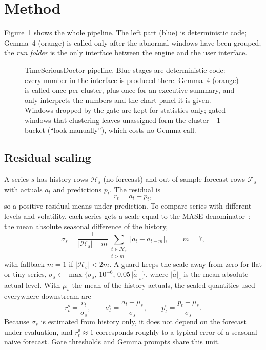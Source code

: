 \documentclass[10pt,twocolumn,a4paper]{article}
\newcommand{\rS}{r^{\mathrm{s}}}
\newcommand{\aS}{a^{\mathrm{s}}}
\newcommand{\pS}{p^{\mathrm{s}}}
\begin{document}
\section{Method}
\label{sec:method}

Figure~\ref{fig:arch} shows the whole pipeline. The left part (blue) is deterministic code; Gemma~4 (orange) is called only after the abnormal windows have been grouped; the \emph{run folder} is the only interface between the engine and the user interface.

\begin{figure}[t]
  \centering
  
  \caption{TimeSeriousDoctor pipeline. Blue stages are deterministic code: every number in the interface is produced there. Gemma~4 (orange) is called once per cluster, plus once for an executive summary, and only interprets the numbers and the chart panel it is given. Windows dropped by the gate are kept for statistics only; gated windows that clustering leaves unassigned form the cluster $-1$ bucket (``look manually''), which costs no Gemma call.}
  \label{fig:arch}
\end{figure}

\subsection{Residual scaling}
\label{sec:resid}

A series $s$ has history rows $\mathcal H_s$ (no forecast) and out-of-sample forecast rows $\mathcal F_s$ with actuals $a_t$ and predictions $p_t$. The residual is
\begin{equation}
  r_t = a_t - p_t,
\end{equation}
so a positive residual means under-prediction. To compare series with different levels and volatility, each series gets a scale equal to the MASE denominator~\cite{hyndman2006}: the mean absolute seasonal difference of the history,
\begin{equation}
  \sigma_s = \frac{1}{|\mathcal H_s|-m}\sum_{\substack{t\in\mathcal H_s\\ t>m}} \left|a_t - a_{t-m}\right|,
  \qquad m=7,
\end{equation}
with fallback $m=1$ if $|\mathcal H_s| < 2m$. A guard keeps the scale away from zero for flat or tiny series, $\sigma_s \leftarrow \max\{\sigma_s,\,10^{-6},\,0.05\,\overline{|a|}_s\}$, where $\overline{|a|}_s$ is the mean absolute actual level. With $\mu_s$ the mean of the history actuals, the scaled quantities used everywhere downstream are
\begin{equation}
  \rS_t = \frac{r_t}{\sigma_s},\qquad
  \aS_t = \frac{a_t-\mu_s}{\sigma_s},\qquad
  \pS_t = \frac{p_t-\mu_s}{\sigma_s}.
\end{equation}
Because $\sigma_s$ is estimated from history only, it does not depend on the forecast under evaluation, and $\rS_t \approx 1$ corresponds roughly to a typical error of a seasonal-naive forecast. Gate thresholds and Gemma prompts share this unit.
\end{document}
